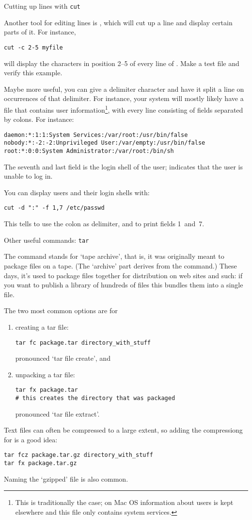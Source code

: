  {Cutting up lines with \protect\texttt{cut}}

Another tool for editing lines is , which will cut up a line
and display certain parts of it. For instance,
\begin{lstlisting}
cut -c 2-5 myfile
\end{lstlisting}
will display the characters in position 2--5 of every line of
. Make a test file and verify this example.

Maybe more useful, you can give  a delimiter character and have
it split a line on occurrences of that delimiter. For instance, your system
will mostly likely have a file  that contains user
information\footnote{This is traditionally the case; on Mac OS
  information about users is kept elsewhere and this file only
  contains system services.}, with every line consisting of fields
separated by colons. For instance:
\begin{lstlisting}
daemon:*:1:1:System Services:/var/root:/usr/bin/false
nobody:*:-2:-2:Unprivileged User:/var/empty:/usr/bin/false
root:*:0:0:System Administrator:/var/root:/bin/sh
\end{lstlisting}
The seventh and last field is the login shell of the user;
 indicates that the user is unable to log in.

You can display users and their login shells with:
\begin{lstlisting}
cut -d ":" -f 1,7 /etc/passwd
\end{lstlisting}
This tells  to use the colon as delimiter, and to print fields
1~and~7.

 {Other useful commands: \protect\texttt{tar}}

The  command stands for `tape archive',
that is, it was originally meant to package files on a tape.
(The `archive' part derives from the  command.)
These days, it's used to package files together for distribution
on web sites and such: if you want to publish a library of hundreds of files
this bundles them into a single file.

The two most common options are for 
\begin{enumerate}
\item creating a tar file:
\begin{lstlisting}
tar fc package.tar directory_with_stuff
\end{lstlisting}
pronounced `tar file create', and
\item unpacking a tar file:
\begin{lstlisting}
tar fx package.tar
# this creates the directory that was packaged
\end{lstlisting}
pronounced `tar file extract'.
\end{enumerate}
Text files can often be compressed to a large extent, so
adding the  compressiong for 
is a good idea:
\begin{lstlisting}
tar fcz package.tar.gz directory_with_stuff
tar fx package.tar.gz
\end{lstlisting}
Naming the `gzipped' file 
is also common.

